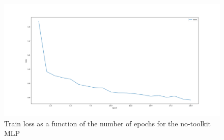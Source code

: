 \documentclass[12pt]{article}
\begin{document}
\begin{itemize}
          \begin{figure}[H]
              \centering
              \includegraphics[width=1\linewidth]{../outputs/hw1-q1-2b.001-loss.png}
              \caption{Train loss as a function of the number of epochs for the no-toolkit MLP}
              \label{fig:1.2b:loss}
          \end{figure}
\end{itemize}
\end{document}
